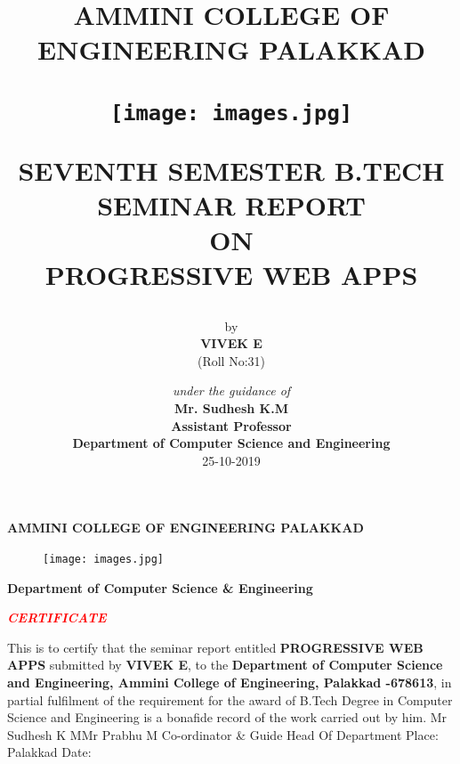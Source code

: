 \documentclass[14pt,a4paper,final]{extreport}
\author{{{by}}\\
\textbf{VIVEK E }\\
	(Roll No:31)\\[2pt]
 }
\title{{\large\textbf{AMMINI COLLEGE OF ENGINEERING PALAKKAD}} \\
\begin{figure}[h]
	\begin{center}
\texttt{[image: images.jpg]} \\[.1cm]
\end{center}
\end{figure}
{\large\textbf{SEVENTH SEMESTER B.TECH\\[.5 cm]}}
	{\large\textbf{SEMINAR REPORT\\[.5 cm]}}
	{\large \textbf{ON\\[.2 cm]}}
	{\large \textbf {PROGRESSIVE WEB APPS}}
		}
\date{
\textit{under the guidance of} \\[0.2cm]
	\textbf{ Mr. Sudhesh K.M} \\
	\textbf{Assistant Professor}\\
	\vspace{.1cm}
	\large\textbf{Department of Computer Science and Engineering} \\
}
\begin{document}
\clearpage\maketitle
\thispagestyle{empty}


\begin{center}\fontsize{17}{17} \selectfont \textbf{AMMINI COLLEGE OF ENGINEERING PALAKKAD}\end{center}
\begin{figure}[h]
	\begin{center}
		\texttt{[image: images.jpg]}
		\vspace{.1 cm}
	\end{center}
\end{figure}
\begin{center}\fontsize{17}{17} \selectfont \textbf{\large Department of Computer Science \& Engineering\\[2cm] }\end{center}
\begin{center}
\emph{\textcolor{red}{\Large \bf CERTIFICATE}}
\end{center}
{This is to certify that the seminar report entitled {\bf{PROGRESSIVE WEB APPS}} submitted by {\bf VIVEK E}, to the {\bf Department of Computer Science and Engineering, Ammini College of Engineering, Palakkad -678613}, in partial fulfilment of the requirement for the award of B.Tech Degree in Computer Science and Engineering is a bonafide record of the work carried out by him.}
\newline
\newline
\newline
\newline
  \hspace{1cm}Mr Sudhesh K M\hspace{8.7cm}Mr Prabhu M
\newline
Co-ordinator \& Guide\hspace{6.75cm} Head Of Department
\newline
\newline
Place$:$\hspace{.5cm}Palakkad 
\newline
\renewcommand{\dateseparator}{-}
Date$:$\hspace{.5cm}\date{25-10-2019}%
\newline
\end{document}
